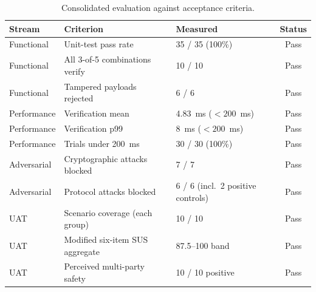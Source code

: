 \begin{table}[H]
  \centering
  \caption{Consolidated evaluation against acceptance criteria.}
  \label{tab:results-summary}
  \begin{tabular}{|l|l|l|c|}
    \hline
    Stream & Criterion & Measured & Status \\\hline
    Functional & Unit-test pass rate & 35 / 35 (100\%) & Pass \\\hline
    Functional & All 3-of-5 combinations verify & 10 / 10 & Pass \\\hline
    Functional & Tampered payloads rejected & 6 / 6 & Pass \\\hline
    Performance & Verification mean & 4.83~ms ($< 200$~ms) & Pass \\\hline
    Performance & Verification p99 & 8~ms ($< 200$~ms) & Pass \\\hline
    Performance & Trials under 200~ms & 30 / 30 (100\%) & Pass \\\hline
    Adversarial & Cryptographic attacks blocked & 7 / 7 & Pass \\\hline
    Adversarial & Protocol attacks blocked & 6 / 6 (incl.\ 2 positive controls) & Pass \\\hline
    UAT & Scenario coverage (each group) & 10 / 10 & Pass \\\hline
    UAT & Modified six-item SUS aggregate & 87.5--100 band & Pass \\\hline
    UAT & Perceived multi-party safety & 10 / 10 positive & Pass \\\hline
  \end{tabular}
\end{table}
